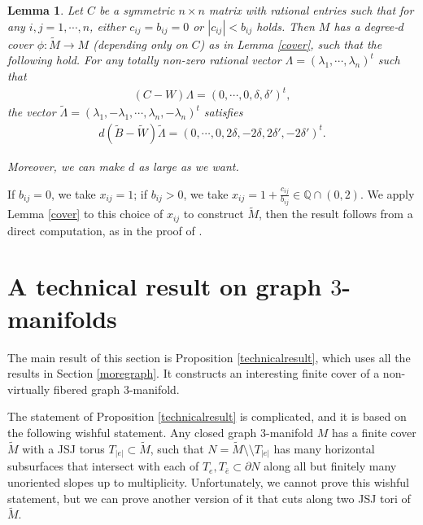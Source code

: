 \documentclass{amsart}
\numberwithin{equation}{section}
\newtheorem{lemma}[theorem]{Lemma}
\theoremstyle{definition}
\begin{document}
\begin{lemma}\label{existsolution}
Let $C$ be a symmetric $n\times n$ matrix with rational entries such that for any $i,j=1,\cdots,n$, either $c_{ij}=b_{ij}=0$ or $|c_{ij}|< b_{ij}$ holds. Then $M$ has a degree-$d$ cover $\phi:\tilde{M}\to M$ (depending only on $C$) as in Lemma \ref{cover},  such that the following hold. For any totally non-zero rational vector $\Lambda=(\lambda_1,\cdots,\lambda_n)^t$ such that 
\begin{align}\label{5.13}
(C-W)\Lambda=
(0, \cdots, 0, \delta, \delta')^t,
\end{align}
the vector
$\tilde{\Lambda}=(\lambda_1,-\lambda_1,\cdots,\lambda_n,-\lambda_n)^t$ satisfies
\begin{align}\label{5.14}
d(\tilde{B}-\tilde{W})\tilde{\Lambda}=
(0, \cdots, 0, 2\delta, -2\delta, 2\delta', -2\delta')^t.
\end{align}

Moreover, we can make $d$ as large as we want.
\end{lemma}

If $b_{ij}=0$, we take $x_{ij}=1$; if $b_{ij}>0$, we take $x_{ij}=1+\frac{c_{ij}}{b_{ij}}\in \mathbb{Q}\cap (0,2)$. We apply Lemma \ref{cover} to this choice of $x_{ij}$ to construct $\tilde{M}$, then the result follows from a direct computation, as in the proof of \cite[Lemma 3.1]{WY}.


\section{A technical result on graph $3$-manifolds}\label{technicalsection}

The main result of this section is Proposition \ref{technicalresult}, which uses all the results in Section \ref{moregraph}. It constructs an interesting finite cover of a non-virtually fibered graph $3$-manifold.

The statement of Proposition \ref{technicalresult} is complicated, and it is based on the following wishful statement. Any closed graph $3$-manifold $M$ has a finite cover $\tilde{M}$ with a JSJ torus $T_{|e|}\subset \tilde{M}$, such that $N=\tilde{M}\setminus\setminus T_{|e|}$ has many horizontal subsurfaces that intersect with each of $T_e,T_{\bar{e}}\subset \partial N$ along all but finitely many unoriented slopes up to multiplicity.  Unfortunately, we cannot prove this wishful statement, but we can prove another version of it that cuts along two JSJ tori of $\tilde{M}$.
\end{document}
